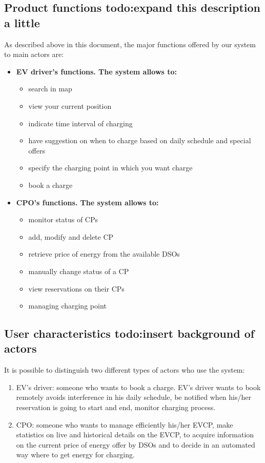 \subsection{Product functions todo:expand this description a little}
As described above in this document, the major functions offered by our system to main actors are:\\
\begin{itemize}
      \item \textbf{EV driver's functions. The system allows to:}
            \begin{itemize}
                  \item search in map
                  \item view your current position
                  \item indicate time interval of charging
                  \item have suggestion on when to charge based on daily schedule and special offers
                  \item specify the charging point in which you want charge
                  \item book a charge
            \end{itemize}
\end{itemize}
\begin{itemize}
      \item \textbf{CPO's functions. The system allows to:}
            \begin{itemize}
                  \item monitor status of CPs
                  \item add, modify and delete CP
                  \item retrieve price of energy from the available DSOs
                  \item manually change status of a CP
                  \item view reservations on their CPs
                  \item managing charging point
            \end{itemize}
\end{itemize}


\subsection{User characteristics todo:insert background of actors}
It is possible to distinguish two different types of actors who use the system:
\begin{enumerate}
      \item EV's driver: someone who wants to book a charge. EV's driver wants to book remotely
            avoids interference in his daily schedule, be notified when his/her reservation
            is going to start and end, monitor charging process.
      \item CPO: someone who wants to manage efficiently his/her EVCP, make statistics on live and historical details on the EVCP,
            to acquire information on the current price of energy offer by DSOs and to decide in an automated way
            where to get energy for charging.
\end{enumerate}


